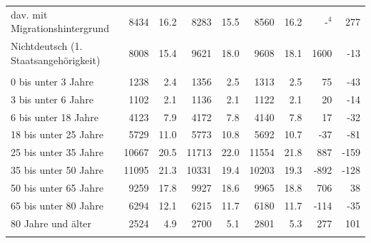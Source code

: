 \documentclass[
  a4paper,
  twoside]{article}
\begin{document}
\begin{table}[!h]
{\begin{threeparttable}
\begin{tabular}[t]{lrrrrrrrr}
\hspace{1em}\hspace{2em}dav. mit Migrationshintergrund & 8434 & 16.2 & 8283 & 15.5 & 8560 & 16.2 & -$^{4}$ & 277\\
\hspace{1em}\hspace{1em}Nichtdeutsch (1. Staatsangehörigkeit) & 8008 & 15.4 & 9621 & 18.0 & 9608 & 18.1 & 1600 & -13\\
\addlinespace[0.3em]
\multicolumn{9}{l}{\textcolor[HTML]{044891}{Bevölkerung nach Altersgruppen}}\\
\hspace{1em}\hspace{1em}0 bis unter 3 Jahre & 1238 & 2.4 & 1356 & 2.5 & 1313 & 2.5 & 75 & -43\\
\hspace{1em}\hspace{1em}3 bis unter 6 Jahre & 1102 & 2.1 & 1136 & 2.1 & 1122 & 2.1 & 20 & -14\\
\hspace{1em}\hspace{1em}6 bis unter 18 Jahre & 4123 & 7.9 & 4172 & 7.8 & 4140 & 7.8 & 17 & -32\\
\hspace{1em}\hspace{1em}18 bis unter 25 Jahre & 5729 & 11.0 & 5773 & 10.8 & 5692 & 10.7 & -37 & -81\\
\hspace{1em}\hspace{1em}25 bis unter 35 Jahre & 10667 & 20.5 & 11713 & 22.0 & 11554 & 21.8 & 887 & -159\\
\hspace{1em}\hspace{1em}35 bis unter 50 Jahre & 11095 & 21.3 & 10331 & 19.4 & 10203 & 19.3 & -892 & -128\\
\hspace{1em}\hspace{1em}50 bis unter 65 Jahre & 9259 & 17.8 & 9927 & 18.6 & 9965 & 18.8 & 706 & 38\\
\hspace{1em}\hspace{1em}65 bis unter 80 Jahre & 6294 & 12.1 & 6215 & 11.7 & 6180 & 11.7 & -114 & -35\\
\hspace{1em}\hspace{1em}80 Jahre und älter & 2524 & 4.9 & 2700 & 5.1 & 2801 & 5.3 & 277 & 101\\
\addlinespace[0.3em]

\end{tabular}
\end{threeparttable}}
\end{table}
\end{document}
